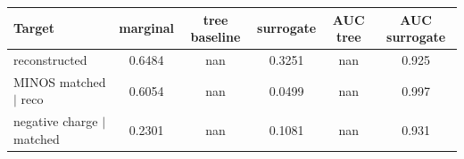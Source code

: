 \begin{tabular}{lccccc}
\toprule
Target & marginal & tree baseline & surrogate & AUC tree & AUC surrogate \\
\midrule
reconstructed & 0.6484 & nan & 0.3251 & nan & 0.925 \\
MINOS matched $\mid$ reco & 0.6054 & nan & 0.0499 & nan & 0.997 \\
negative charge $\mid$ matched & 0.2301 & nan & 0.1081 & nan & 0.931 \\
\bottomrule
\end{tabular}
